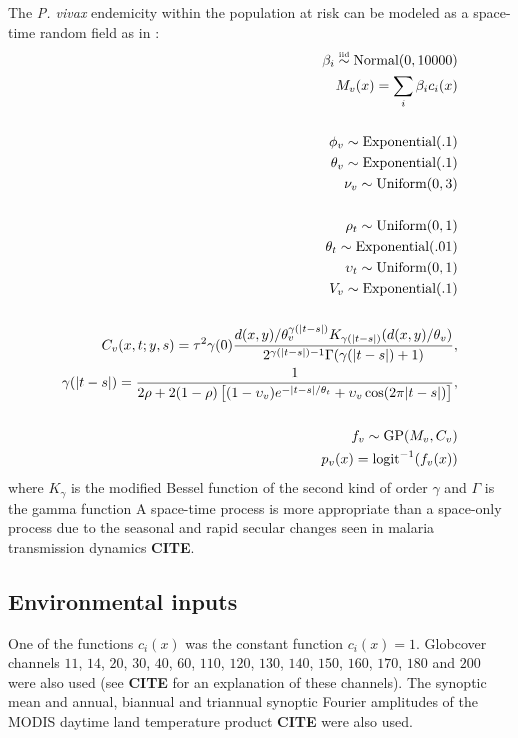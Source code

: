 The \emph{P. vivax} endemicity within the population at risk can be modeled as a space-time random field as in \cite{hay:2007}:
\begin{eqnarray*}
    \beta_{i} \stackrel{\textup{\tiny iid}}{\sim} \textup{Normal}(0,10000)\\
    M_v(x) = \sum_i\beta_ic_i(x)\\
    \\
    \phi_v\sim\textup{Exponential}(.1)\\
    \theta_v\sim\textup{Exponential}(.1)\\
    \nu_v\sim\textup{Uniform}(0,3)\\
    \\
    \rho_t\sim \textup{Uniform}(0,1) \\
    \theta_t\sim \textup{Exponential}(.01) \\
    \upsilon_t\sim \textup{Uniform}(0,1)\\
    V_v\sim\textup{Exponential}(.1)\\   
    \\ C_v(x,t;y,s)=\tau^2\gamma(0)\frac{d(x,y)/\theta_v^{\gamma(|t-s|)}K_{\gamma(|t-s|)}(d(x,y)/\theta_v)}{2^{\gamma(|t-s|)-1}\Gamma(\gamma(|t-s|)+1)},\\ 
    \gamma(|t-s|) = \frac{1}{2\rho+2(1-\rho)\left[(1-\upsilon_v)e^{-|t-s|/\theta_t}+\upsilon_v\cos(2\pi |t-s|)\right]},\\
    \\
    f_v\sim\textup{GP}(M_v, C_v)\\
    p_v(x)=\textup{logit}^{-1}(f_{v}(x))
\end{eqnarray*} 
where $K_\gamma$ is the modified Bessel function of the second kind of order $\gamma$ and $\Gamma$ is the gamma function \cite{abramowitz:1965}  A space-time process is more appropriate than a space-only process due to the seasonal and rapid secular changes seen in malaria transmission dynamics \textbf{CITE}. 

\subsection*{Environmental inputs}
One of the functions $c_i(x)$ was the constant function $c_i(x)=1$. Globcover channels $11$, $14$, $20$, $30$, $40$, $60$, $110$, $120$, $130$, $140$, $150$, $160$, $170$, $180$ and $200$ were also used (see \textbf{CITE} for an explanation of these channels). The synoptic mean and annual, biannual and triannual synoptic Fourier amplitudes of the MODIS daytime land temperature product \textbf{CITE} were also used.


